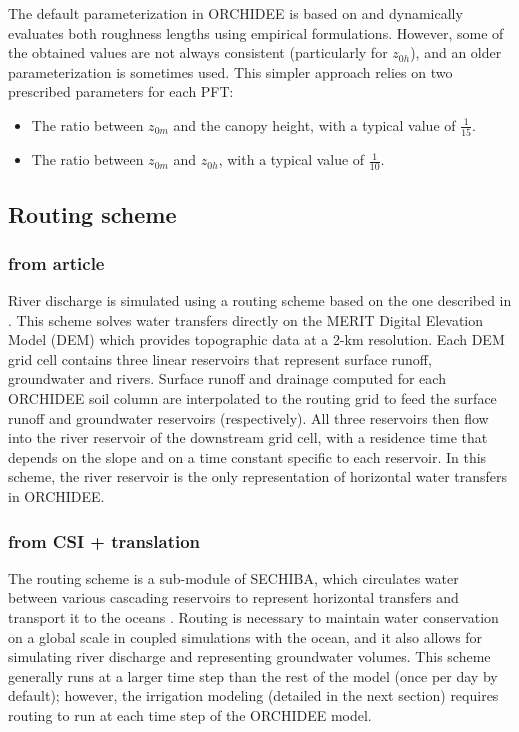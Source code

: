 The default parameterization in ORCHIDEE is based on \cite{su_evaluation_2001} and dynamically evaluates both roughness lengths using empirical formulations. However, some of the obtained values are not always consistent (particularly for $z_{0h}$), and an older parameterization is sometimes used. This simpler approach relies on two prescribed parameters for each PFT:  
\begin{itemize}
    \item The ratio between $z_{0m}$ and the canopy height, with a typical value of $\frac{1}{15}$.
    \item The ratio between $z_{0m}$ and $z_{0h}$, with a typical value of $\frac{1}{10}$.  
\end{itemize}

\subsection{Routing scheme}
\subsubsection{from article}
River discharge is simulated using a routing scheme based on the one described in \cite{ngo-duc_validation_2007}.
This scheme solves water transfers directly on the MERIT Digital Elevation Model (DEM) \citep{yamazaki_merit_2019} which provides topographic data at a 2-km resolution. Each DEM grid cell contains three linear reservoirs that represent surface runoff, groundwater and rivers. Surface runoff and drainage computed for each ORCHIDEE soil column are interpolated to the routing grid to feed the surface runoff and groundwater reservoirs (respectively). All three reservoirs then flow into the river reservoir of the downstream grid cell, with a residence time that depends on the slope and on a time constant specific to each reservoir. 
In this scheme, the river reservoir is the only representation of horizontal water transfers in ORCHIDEE.

\subsubsection{from CSI + translation}
The routing scheme is a sub-module of SECHIBA, which circulates water between various cascading reservoirs to represent horizontal transfers and transport it to the oceans \cite{ducharne_development_2003, ngo-duc_validation_2007}. 
Routing is necessary to maintain water conservation on a global scale in coupled simulations with the ocean, and it also allows for simulating river discharge and representing groundwater volumes. 
This scheme generally runs at a larger time step than the rest of the model (once per day by default); however, the irrigation modeling (detailed in the next section) requires routing to run at each time step of the ORCHIDEE model.

